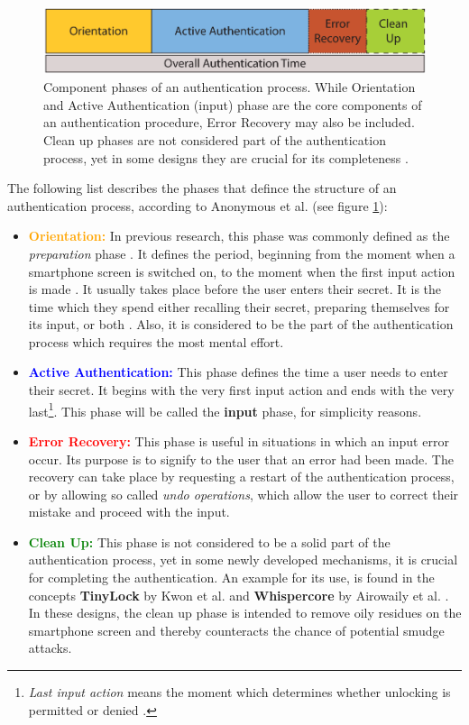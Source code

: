 \begin{figure}[t!]
\centering
\includegraphics[width=13cm, height=2cm]{Chapters/graphics/Phases.PNG}
\caption{Component phases of an authentication process. While Orientation and Active Authentication (input) phase are the core components of an authentication procedure, Error Recovery may also be included. Clean up phases are not considered part of the authentication process, yet in some designs they are crucial for its completeness \cite{anonymous}. }
\label{fig:phases}
\end{figure}

The following list describes the phases that defince the structure of an authentication process, according to Anonymous et al. \cite{anonymous} (see figure \ref{fig:phases}):

\begin{itemize}
    \item \textbf{\textcolor{orange}{Orientation:}} In previous research, this phase was commonly defined as the \textit{preparation} phase . It defines the period, beginning from the moment when a smartphone screen is switched on, to the moment when the first input action is made . It usually takes place before the user enters their secret. It is the time which they spend either recalling their secret, preparing themselves for its input, or both . Also, it is considered to be the part of the authentication process which requires the most mental effort.  
    \item \textbf{\textcolor{blue}{Active Authentication:}} This phase defines the time a user needs to enter their secret. It begins with the very first input action and ends with the very last\footnote{ \textit{Last input action} means the moment which determines whether unlocking is permitted or denied \cite{anonymous}.}. This phase will be called the \textbf{input} phase, for simplicity reasons.
    \item \textbf{\textcolor{red}{Error Recovery:}} This phase is useful in situations in which an input error occur. Its purpose is to signify to the user that an error had been made. The recovery can take place by requesting a restart of the authentication process, or by allowing so called \textit{undo operations}, which allow the user to correct their mistake and proceed with the input. 
    \item \textbf{\textcolor{green}{Clean Up:}} This phase is not considered to be a solid part of the authentication process, yet in some newly developed mechanisms, it is crucial for completing the authentication. An example for its use, is found in the concepts \textbf{TinyLock} by Kwon et al. \cite{kwon} and \textbf{Whispercore} by Airowaily et al. \cite{Airowaily}. In these designs, the clean up phase is intended to remove oily residues on the smartphone screen and thereby counteracts the chance of potential smudge attacks. 
\end{itemize}

